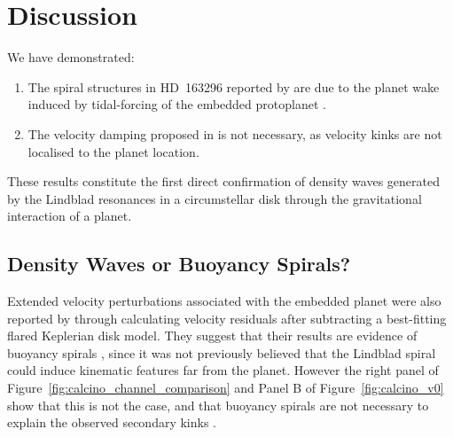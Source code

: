 
%

\section{Discussion}

We have demonstrated:
\begin{enumerate}
    \item The spiral structures in HD~163296 reported by \citet{teague2021} are due to the planet wake induced by tidal-forcing of the embedded protoplanet \citep{pinte2018a}.
    \item The velocity damping proposed in  is not necessary, as velocity kinks are not localised to the planet location.
\end{enumerate}

\noindent These results constitute the first direct confirmation of density waves generated by the Lindblad resonances in a circumstellar disk through the gravitational interaction of a planet.

\subsection{Density Waves or Buoyancy Spirals?}

Extended velocity perturbations associated with the embedded planet were also reported by \citet{teague2021} through calculating velocity residuals after subtracting a best-fitting flared Keplerian disk model.
They suggest that their results are evidence of buoyancy spirals \citep{zhu2012,bae2021}, since it was not previously believed that the Lindblad spiral could induce kinematic features far from the planet.
However the right panel of Figure~\ref{fig:calcino_channel_comparison} and Panel B of Figure~\ref{fig:calcino_v0} show that this is not the case, and that buoyancy spirals are not necessary to explain the observed secondary kinks .

